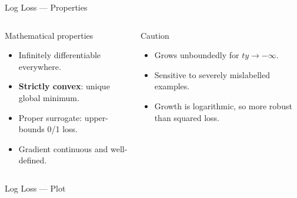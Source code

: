 \begin{frame}{Log Loss — Properties}
  \begin{columns}[t]
      \begin{block}{Mathematical properties}
        \begin{itemize}
          \item Infinitely differentiable everywhere.
          \item \textbf{Strictly convex}: unique global minimum.
          \item Proper surrogate: upper-bounds 0/1 loss.
          \item Gradient continuous and well-defined.
        \end{itemize}
      \end{block}
      \begin{alertblock}{Caution}
        \begin{itemize}
          \item Grows unboundedly for $ty\to-\infty$.
          \item Sensitive to severely mislabelled examples.
          \item Growth is logarithmic, so more robust than squared loss.
        \end{itemize}
      \end{alertblock}
  \end{columns}
\end{frame}

\begin{frame}{Log Loss — Plot}
  \begin{center}
  \end{center}
\end{frame}

